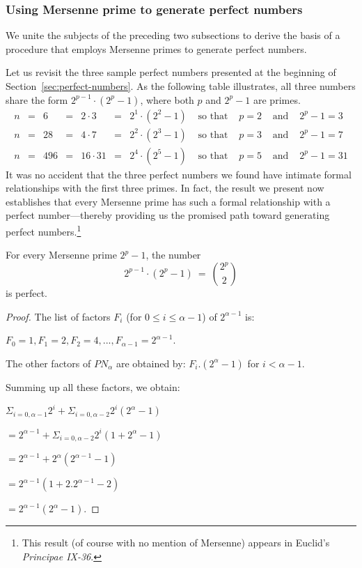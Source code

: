\subsubsection{Using Mersenne prime to generate perfect numbers}
\label{sec:MP+PN}

We unite the subjects of the preceding two subsections to derive the
basis of a procedure that employs Mersenne primes to generate perfect
numbers.

Let us revisit the three sample perfect numbers presented at the
beginning of Section~\ref{sec:perfect-numbers}.  As the following
table illustrates, all three numbers share the form $2^{p-1} \cdot
(2^p -1)$, where both $p$ and $2^p-1$ are primes.
\[ \begin{array}{ccrcrcccccc}
n & = & 6   & = & 2 \cdot 3  & = & 2^1 \cdot (2^2 -1) & 
\mbox{ so that } & p = 2 & 
\mbox{ and } & 2^p-1 = 3 \\
n & = & 28  & = & 4 \cdot 7  & = & 2^2 \cdot (2^3 -1) & 
\mbox{ so that } & p = 3 &
\mbox{ and } & 2^p-1 = 7 \\
n & = & 496 & = & 16 \cdot 31 & = & 2^4 \cdot (2^5 -1) & 
\mbox{ so that } & p=5 &
\mbox{ and } & 2^p-1 = 31
\end{array}
\]
It was no accident that the three perfect numbers we found have
intimate formal relationships with the first three primes.  In fact,
the result we present now establishes that every Mersenne prime has
such a formal relationship with a perfect number---thereby providing
us the promised path toward generating perfect numbers.\footnote{This
  result (of course with no mention of Mersenne) appears in Euclid's
  \textit{Principae IX-36}. }

\begin{prop}
\label{thm:MP-PN}
For every Mersenne prime $2^p-1$, the number
\begin{equation}
\label{eq:Mersenne-perfect-p}
2^{p-1} \cdot (2^p-1) \ = \ {{2^p} \choose 2}
\end{equation} 
is perfect.
\end{prop}

\begin{proof}

The list of factors $F_i$ (for $0 \leq i \leq \alpha-1$) of $2^{\alpha-1}$ is: 

$F_0=1, F_1=2, F_2=4, ..., F_{\alpha-1}=2^{\alpha-1}$.

The other factors of $PN_\alpha$ are obtained by: $F_i.(2^\alpha-1)$ for $i < \alpha-1$.

Summing up all these factors, we obtain:

$\Sigma_{i=0,\alpha-1} 2^{i} + \Sigma_{i=0,\alpha-2} 2^{i}(2^\alpha-1)$

$= 2^{\alpha-1} + \Sigma_{i=0,\alpha-2} 2^{i}(1+2^\alpha-1)$

$ = 2^{\alpha-1} + 2^{\alpha} (2^{\alpha-1} -1) $

$ = 2^{\alpha-1} (1+2.2^{\alpha-1}-2) $

$= 2^{\alpha-1} (2^{\alpha}-1)$.

\end{proof}



